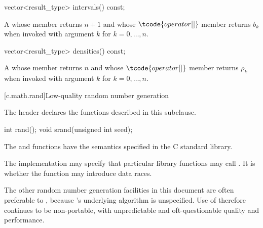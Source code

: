 %
\begin{itemdecl}
vector<result_type> intervals() const;
\end{itemdecl}

\begin{itemdescr}
\pnum
\returns
A 
 whose  member returns $n + 1$
 and whose $ \tcode{operator[]} $ member returns $b_k$
 when invoked with argument $k$ for $k = 0, \dotsc, n$.
\end{itemdescr}

%
\begin{itemdecl}
vector<result_type> densities() const;
\end{itemdecl}

\begin{itemdescr}
\pnum
\returns
A 
 whose  member returns $n$
 and whose $ \tcode{operator[]} $ member returns $\rho_k$
 when invoked with argument $k$ for $k = 0, \dotsc, n$.
\end{itemdescr}%
%
%
%
%

[c.math.rand]{Low-quality random number generation}

\pnum
\begin{note}
The header 
declares the functions described in this subclause.
\end{note}

%
%
\begin{itemdecl}
int rand();
void srand(unsigned int seed);
\end{itemdecl}

\begin{itemdescr}
\pnum
\effects
The
 and 
functions have the semantics specified in the C standard library.

\pnum
\remarks
The implementation
may specify that particular library functions may call
.
It is 
whether the  function
may introduce data races.
\begin{note}
%
The other random
number generation facilities in this document are often preferable
to , because 's underlying algorithm is unspecified.
Use of  therefore continues to be non-portable, with unpredictable
and oft-questionable quality and performance.
\end{note}
\end{itemdescr}

